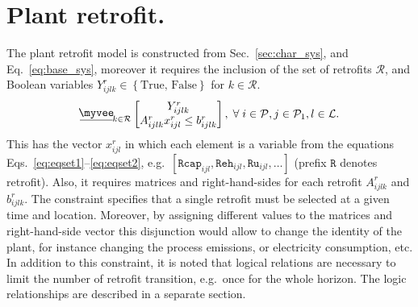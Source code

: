 \documentclass{amsart}
\newcommand{\myveebar}{\mathbin{\vcenter{\hbox{$ \underline{\mkern-2.4mu{\myvee}\mkern-2.4mu} $}}}}
\begin{document}
\section{Plant retrofit.}\label{sec:rf}
%
The plant retrofit model is constructed from Sec.~\ref{sec:char_sys}, and
Eq.~\eqref{eq:base_sys}, moreover it requires the inclusion of the set of
retrofits $\mathcal{R}$, and Boolean variables $Y^r_{ijlk} \in
\left\{\text{True, False}\right\}$ for $k\in \mathcal{R}$.
%
\begin{equation}\label{eq:rf}
    \myveebar_{k \in \mathcal{R}}
    \begin{bmatrix}
        Y^r_{ijlk} \\
        A^r_{ijlk} x^r_{ijl} \leq b^r_{ijlk}
    \end{bmatrix},
    \; \forall \; i \in \mathcal{P},j \in \mathcal{P}_1 ,
    l \in \mathcal{L}.
\end{equation}
%
This has the vector $x^r_{ijl}$ in which each element is a variable from the
equations Eqs.~\eqref{eq:eqset1}--\eqref{eq:eqset2}, e.g.\
$\left[\mathtt{Rcap}_{ijl}, \mathtt{Reh}_{ijl}, \mathtt{Ru}_{ijl}, \dots
\right]$ (prefix $\mathtt{R}$ denotes retrofit). Also, it requires matrices and
right-hand-sides for each retrofit $A^r_{ijlk}$ and $b^r_{ijlk}$. 
The constraint specifies that a single retrofit must be selected at a given time
and location.
Moreover, by assigning different values to the matrices and right-hand-side
vector this disjunction would allow to change the identity of the plant, for
instance changing the process emissions, or electricity consumption, etc. 
In addition to this constraint, it is noted that logical relations are necessary
to limit the number of retrofit transition, e.g.\ once for the whole horizon.
The logic relationships are described in a separate section. 
%
\end{document}
